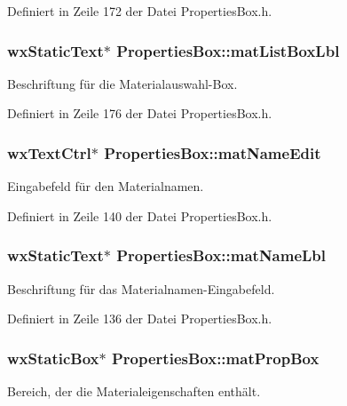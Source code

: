 Definiert in Zeile 172 der Datei Properties\-Box.\-h.

\hypertarget{classPropertiesBox_aa08a220302b1d89a196dc7e03a390bd6}{
\subsubsection[{mat\-List\-Box\-Lbl}]{\setlength{\rightskip}{0pt plus 5cm}wx\-Static\-Text$\ast$ Properties\-Box\-::mat\-List\-Box\-Lbl\hspace{0.3cm}{\ttfamily [private]}}}\label{classPropertiesBox_aa08a220302b1d89a196dc7e03a390bd6}
Beschriftung für die Materialauswahl-\/\-Box. 

Definiert in Zeile 176 der Datei Properties\-Box.\-h.

\hypertarget{classPropertiesBox_aba989cc01ddce5251f021419bfe3408f}{
\subsubsection[{mat\-Name\-Edit}]{\setlength{\rightskip}{0pt plus 5cm}wx\-Text\-Ctrl$\ast$ Properties\-Box\-::mat\-Name\-Edit\hspace{0.3cm}{\ttfamily [private]}}}\label{classPropertiesBox_aba989cc01ddce5251f021419bfe3408f}
Eingabefeld für den Materialnamen. 

Definiert in Zeile 140 der Datei Properties\-Box.\-h.

\hypertarget{classPropertiesBox_ae07827304c19b4e71532fed5a4c65bb0}{
\subsubsection[{mat\-Name\-Lbl}]{\setlength{\rightskip}{0pt plus 5cm}wx\-Static\-Text$\ast$ Properties\-Box\-::mat\-Name\-Lbl\hspace{0.3cm}{\ttfamily [private]}}}\label{classPropertiesBox_ae07827304c19b4e71532fed5a4c65bb0}
Beschriftung für das Materialnamen-\/\-Eingabefeld. 

Definiert in Zeile 136 der Datei Properties\-Box.\-h.

\hypertarget{classPropertiesBox_a1ff3669bf863d80a26d2d9874b1868e1}{
\subsubsection[{mat\-Prop\-Box}]{\setlength{\rightskip}{0pt plus 5cm}wx\-Static\-Box$\ast$ Properties\-Box\-::mat\-Prop\-Box\hspace{0.3cm}{\ttfamily [private]}}}\label{classPropertiesBox_a1ff3669bf863d80a26d2d9874b1868e1}
Bereich, der die Materialeigenschaften enthält. 

